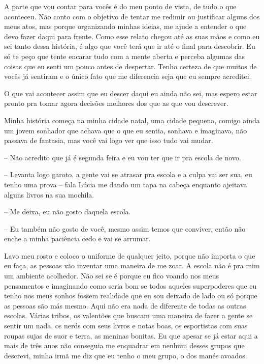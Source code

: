 A parte que vou contar para vocês é do meu ponto de vista, de tudo o que aconteceu. Não conto com o objetivo de tentar me redimir ou justificar alguns dos meus atos, mas porque organizando minhas ideias, me ajude a entender o que devo fazer daqui para frente. Como esse relato chegou até as suas mãos e como eu sei tanto dessa história, é algo que você terá que ir até o final para descobrir. Eu só te peço que tente encarar tudo com a mente aberta e perceba algumas das coisas que eu senti um pouco antes de despertar. Tenho certeza de que muitos de vocês já sentiram e o único fato que me diferencia seja que eu sempre acreditei.

O que vai acontecer assim que eu descer daqui eu ainda não sei, mas espero estar pronto pra tomar agora decisões melhores dos que as que vou descrever.

Minha história começa na minha cidade natal, uma cidade pequena, comigo ainda um jovem sonhador que achava que o que eu sentia, sonhava e imaginava, não passava de fantasia, mas você vai logo ver que isso tudo vai mudar.

-- Não acredito que já é segunda feira e eu vou ter que ir pra escola de novo.

-- Levanta logo garoto, a gente vai se atrasar pra escola e a culpa vai ser sua, eu tenho uma prova -- fala Lúcia me dando um tapa na cabeça enquanto ajeitava alguns livros na sua mochila.

-- Me deixa, eu não gosto daquela escola.

-- Eu também não gosto de você, mesmo assim temos que conviver, então não enche a minha paciência cedo e vai se arrumar.

Lavo meu rosto e coloco o uniforme de qualquer jeito, porque não importa o que eu faça, as pessoas vão inventar uma maneira de me zoar. A escola não é pra mim um ambiente acolhedor. Não sei se é porque eu fico voando nos meus pensamentos e imaginando como seria bom se todos aqueles superpoderes que eu tenho nos meus sonhos fossem realidade que eu sou deixado de lado ou só porque as pessoas são más mesmo. Aqui não era nada de diferente de todas as outras escolas. Várias tribos, os valentões que buscam uma maneira de fazer a gente se sentir um nada, os nerds com seus livros e notas boas, os esportistas com suas roupas sujas de suor e terra, as meninas bonitas. Eu que apesar se já estar aqui a mais de três anos não conseguia me enquadrar em nenhum desses grupos que descrevi, minha irmã me diz que eu tenho o meu grupo, o dos manés avoados.

